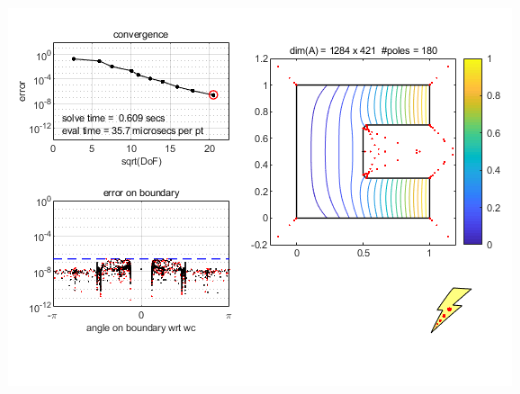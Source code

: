 \documentclass{seminar}
\begin{document}
\begin{slide}
\begin{center}
\includegraphics[scale=0.7]{./PNG/rectSlit3}
\end{center}
\end{slide} %
\end{document}
